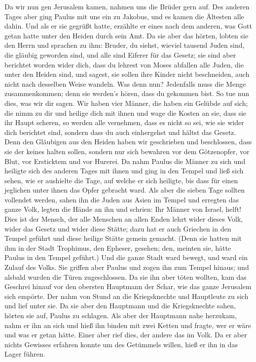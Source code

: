  Da wir nun gen Jerusalem kamen, nahmen uns die Brüder
gern auf.  Des anderen Tages aber ging Paulus mit uns ein
zu Jakobus, und es kamen die Ältesten alle dahin.  Und
als er sie gegrüßt hatte, erzählte er eines nach dem anderen, was Gott
getan hatte unter den Heiden durch sein Amt.  Da sie aber
das hörten, lobten sie den Herrn und sprachen zu ihm: Bruder, du siehst,
wieviel tausend Juden sind, die gläubig geworden sind, und alle sind
Eiferer für das Gesetz;  sie sind aber berichtet worden
wider dich, dass du lehrest von Moses abfallen alle Juden, die unter den
Heiden sind, und sagest, sie sollen ihre Kinder nicht beschneiden, auch
nicht nach desselben Weise wandeln.  Was denn nun?
Jedenfalls muss die Menge zusammenkommen; denn sie werden's hören, dass
du gekommen bist.  So tue nun dies, was wir dir sagen.
 Wir haben vier Männer, die haben ein Gelübde auf sich;
die nimm zu dir und heilige dich mit ihnen und wage die Kosten an sie,
dass sie ihr Haupt scheren, so werden alle vernehmen, dass es nicht so
sei, wie sie wider dich berichtet sind, sondern dass du auch einhergehst
und hältst das Gesetz.  Denn den Gläubigen aus den Heiden
haben wir geschrieben und beschlossen, dass sie der keines halten
sollen, sondern nur sich bewahren vor dem Götzenopfer, vor Blut, vor
Ersticktem und vor Hurerei.  Da nahm Paulus die Männer zu
sich und heiligte sich des anderen Tages mit ihnen und ging in den
Tempel und ließ sich sehen, wie er aushielte die Tage, auf welche er
sich heiligte, bis dass für einen jeglichen unter ihnen das Opfer
gebracht ward.  Als aber die sieben Tage sollten
vollendet werden, sahen ihn die Juden aus Asien im Tempel und erregten
das ganze Volk, legten die Hände an ihn und schrien:  Ihr
Männer von Israel, helft! Dies ist der Mensch, der alle Menschen an
allen Enden lehrt wider dieses Volk, wider das Gesetz und wider diese
Stätte; dazu hat er auch Griechen in den Tempel geführt und diese
heilige Stätte gemein gemacht.  (Denn sie hatten mit ihm
in der Stadt Trophimus, den Epheser, gesehen; den, meinten sie, hätte
Paulus in den Tempel geführt.)  Und die ganze Stadt ward
bewegt, und ward ein Zulauf des Volks. Sie griffen aber Paulus und zogen
ihn zum Tempel hinaus; und alsbald wurden die Türen zugeschlossen.
 Da sie ihn aber töten wollten, kam das Geschrei hinauf
vor den obersten Hauptmann der Schar, wie das ganze Jerusalem sich
empörte.  Der nahm von Stund an die Kriegsknechte und
Hauptleute zu sich und lief unter sie. Da sie aber den Hauptmann und die
Kriegsknechte sahen, hörten sie auf, Paulus zu schlagen. 
Als aber der Hauptmann nahe herzukam, nahm er ihn an sich und hieß ihn
binden mit zwei Ketten und fragte, wer er wäre und was er getan hätte.
 Einer aber rief dies, der andere das im Volk. Da er aber
nichts Gewisses erfahren konnte um des Getümmels willen, hieß er ihn in
das Lager führen.

